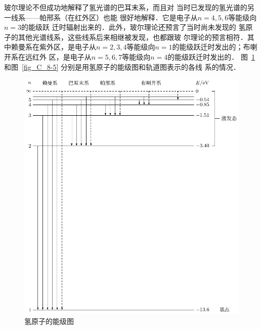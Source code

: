 玻尔理论不但成功地解释了氢光谱的巴耳末系，而且对
当时已发现的氢光谱的另一线系——帕邢系（在红外区）也能
很好地解释．它是电子从$n=4,5,6$等能级向$n=3$的能级跃
迁时辐射出来的．此外，玻尔理论还预言了当时尚未发现的
氢原子的其他光谱线系，这些线系后来相继被发现，也都跟玻
尔理论的预言相符．其中赖曼系在紫外区，是电子从$n=2,
3,4$等能级向$n=1$的能级跃迁时发出的；布喇开系在远红外
区，是电子从$n=5,6,7$等能级向$n=4$的能级跃迁时发出的．
图~\ref{fig_C_8-4} 和图~\ref{fig_C_8-5} 分别是用氢原子的能级图和轨道图表示的各线
系的情况．
\begin{figure}[htbp]
    \centering
    \includegraphics{fig/C/8-4.pdf}
    \caption{氢原子的能级图}\label{fig_C_8-4}
\end{figure}

